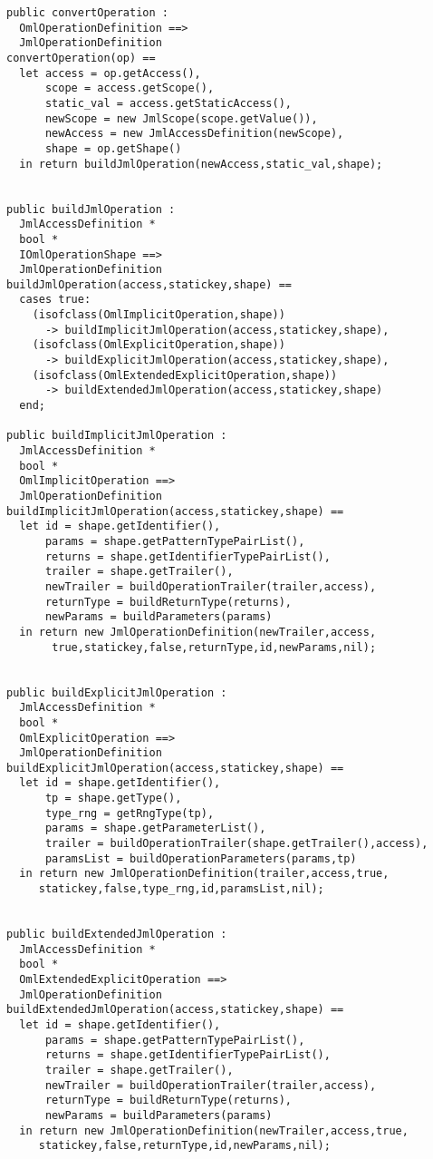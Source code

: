 \begin{lstlisting}
public convertOperation : 
  OmlOperationDefinition ==> 
  JmlOperationDefinition
convertOperation(op) == 
  let access = op.getAccess(),
	  scope = access.getScope(),
	  static_val = access.getStaticAccess(),
	  newScope = new JmlScope(scope.getValue()),
	  newAccess = new JmlAccessDefinition(newScope),
	  shape = op.getShape()
  in return buildJmlOperation(newAccess,static_val,shape);
						

public buildJmlOperation :
  JmlAccessDefinition *
  bool *
  IOmlOperationShape ==>
  JmlOperationDefinition
buildJmlOperation(access,statickey,shape) ==
  cases true:
    (isofclass(OmlImplicitOperation,shape))
	  -> buildImplicitJmlOperation(access,statickey,shape),
	(isofclass(OmlExplicitOperation,shape))
	  -> buildExplicitJmlOperation(access,statickey,shape),
	(isofclass(OmlExtendedExplicitOperation,shape))
	  -> buildExtendedJmlOperation(access,statickey,shape)
  end;

public buildImplicitJmlOperation : 
  JmlAccessDefinition * 
  bool * 
  OmlImplicitOperation ==>
  JmlOperationDefinition
buildImplicitJmlOperation(access,statickey,shape) == 
  let id = shape.getIdentifier(),
	  params = shape.getPatternTypePairList(),
	  returns = shape.getIdentifierTypePairList(),
	  trailer = shape.getTrailer(),
	  newTrailer = buildOperationTrailer(trailer,access),
	  returnType = buildReturnType(returns),
	  newParams = buildParameters(params)
  in return new JmlOperationDefinition(newTrailer,access,
       true,statickey,false,returnType,id,newParams,nil);


public buildExplicitJmlOperation : 
  JmlAccessDefinition * 
  bool *
  OmlExplicitOperation ==>
  JmlOperationDefinition
buildExplicitJmlOperation(access,statickey,shape) == 
  let id = shape.getIdentifier(),
      tp = shape.getType(),
      type_rng = getRngType(tp),
      params = shape.getParameterList(),
      trailer = buildOperationTrailer(shape.getTrailer(),access),
      paramsList = buildOperationParameters(params,tp)
  in return new JmlOperationDefinition(trailer,access,true,
     statickey,false,type_rng,id,paramsList,nil);


public buildExtendedJmlOperation : 
  JmlAccessDefinition * 
  bool *
  OmlExtendedExplicitOperation ==>
  JmlOperationDefinition
buildExtendedJmlOperation(access,statickey,shape) ==
  let id = shape.getIdentifier(),
      params = shape.getPatternTypePairList(),
	  returns = shape.getIdentifierTypePairList(),
	  trailer = shape.getTrailer(),
	  newTrailer = buildOperationTrailer(trailer,access),
	  returnType = buildReturnType(returns),
	  newParams = buildParameters(params)
  in return new JmlOperationDefinition(newTrailer,access,true,
     statickey,false,returnType,id,newParams,nil);



\end{lstlisting}
